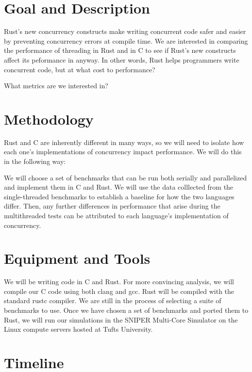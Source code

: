 \documentclass{article}
\begin{document}
\section*{Goal and Description}

Rust's new concurrency constructs make writing concurrent code safer and easier by preventing concurrency errors at compile time. We are interested in comparing the performance of threading in Rust and in C to see if Rust's new constructs affect its peformance in anyway. In other words, Rust helps programmers write concurrent code, but at what cost to performance?

What metrics are we interested in?


\section*{Methodology}

Rust and C are inherently different in many ways, so we will need to isolate how each one's implementations of concurrency impact performance. We will do this in the following way:

We will choose a set of benchmarks that can be run both serially and parallelized and implement them in C and Rust. We will use the data colllected from the single-threaded benchmarks to establish a baseline for how the two languages differ. Then, any further differences in performance that arise during the multithreaded tests can be attributed to each language's implementation of concurrency.


\section*{Equipment and Tools}

We will be writing code in C and Rust. For more convincing analysis, we will compile our C code using both clang and gcc. Rust will be compiled with the standard rustc compiler. We are still in the process of selecting a suite of benchmarks to use. Once we have chosen a set of benchmarks and ported them to Rust, we will run our simulations in the SNIPER Multi-Core Simulator \cite{Sniper} on the Linux compute servers hosted at Tufts University.


\section*{Timeline}





\end{document}
